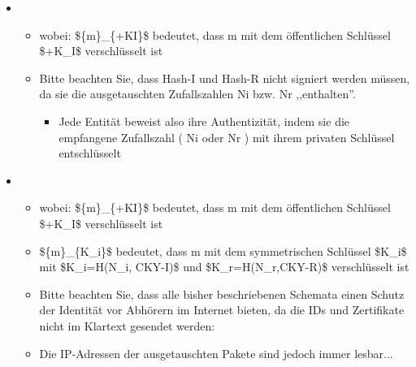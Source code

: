 \documentclass[a4paper]{article}
\begin{document}
\begin{multicols}{3}
    \begin{itemize}
        \item

              \begin{itemize}
                  \item
                        wobei: \$\{m\}\_\{+KI\}\$ bedeutet, dass m mit dem öffentlichen
                        Schlüssel \$+K\_I\$ verschlüsselt ist
                  \item
                        Bitte beachten Sie, dass Hash-I und Hash-R nicht signiert werden
                        müssen, da sie die ausgetauschten Zufallszahlen Ni bzw. Nr
                        ,,enthalten''.

                        \begin{itemize}
                            \item
                                  Jede Entität beweist also ihre Authentizität, indem sie die
                                  empfangene Zufallszahl ( Ni oder Nr ) mit ihrem privaten Schlüssel
                                  entschlüsselt
                        \end{itemize}
              \end{itemize}
        \item

              \begin{itemize}
                  \item
                        wobei: \$\{m\}\_\{+KI\}\$ bedeutet, dass m mit dem öffentlichen
                        Schlüssel \$+K\_I\$ verschlüsselt ist
                  \item
                        \$\{m\}\_\{K\_i\}\$ bedeutet, dass m mit dem symmetrischen Schlüssel
                        \$K\_i\$ mit \$K\_i=H(N\_i, CKY-I)\$ und \$K\_r=H(N\_r,CKY-R)\$
                        verschlüsselt ist
                  \item
                        Bitte beachten Sie, dass alle bisher beschriebenen Schemata einen
                        Schutz der Identität vor Abhörern im Internet bieten, da die IDs und
                        Zertifikate nicht im Klartext gesendet werden:
                  \item
                        Die IP-Adressen der ausgetauschten Pakete sind jedoch immer
                        lesbar...
              \end{itemize}
    \end{itemize}



\end{multicols}
\end{document}
